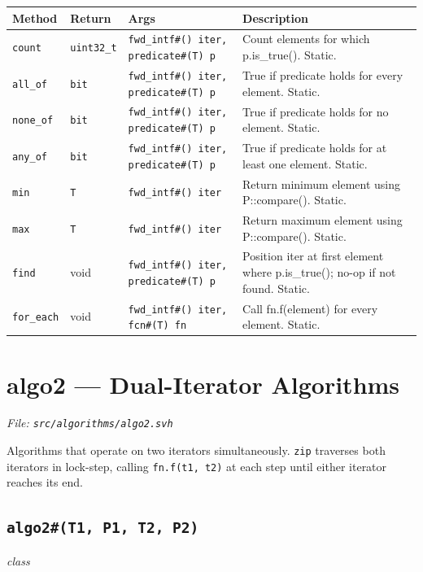 \documentclass[11pt,letterpaper]{report}
\begin{document}
\begin{xltabular}{\linewidth}{>{\small}p{1.35in} >{\small}p{1.25in} >{\small}p{0.95in} >{\small}X}
\toprule
\textbf{Method} & \textbf{Return} & \textbf{Args} & \textbf{Description} \\
\midrule
\endhead
\bottomrule
\endfoot
\texttt{count} & \texttt{uint32\_t} & \texttt{fwd\_intf\#() iter, predicate\#(T) p} & Count elements for which p.is\_true(). Static. \\
\texttt{all\_of} & \texttt{bit} & \texttt{fwd\_intf\#() iter, predicate\#(T) p} & True if predicate holds for every element. Static. \\
\texttt{none\_of} & \texttt{bit} & \texttt{fwd\_intf\#() iter, predicate\#(T) p} & True if predicate holds for no element. Static. \\
\texttt{any\_of} & \texttt{bit} & \texttt{fwd\_intf\#() iter, predicate\#(T) p} & True if predicate holds for at least one element. Static. \\
\texttt{min} & \texttt{T} & \texttt{fwd\_intf\#() iter} & Return minimum element using P::compare(). Static. \\
\texttt{max} & \texttt{T} & \texttt{fwd\_intf\#() iter} & Return maximum element using P::compare(). Static. \\
\texttt{find} & void & \texttt{fwd\_intf\#() iter, predicate\#(T) p} & Position iter at first element where p.is\_true(); no-op if not found. Static. \\
\texttt{for\_each} & void & \texttt{fwd\_intf\#() iter, fcn\#(T) fn} & Call fn.f(element) for every element. Static. \\
\end{xltabular}

\section{algo2 --- Dual-Iterator Algorithms}
\noindent\small\textit{File: \texttt{src/algorithms/algo2.svh}}\par

Algorithms that operate on two iterators simultaneously. \texttt{zip} traverses both iterators in lock-step, calling \texttt{fn.f(t1, t2)} at each step until either iterator reaches its end.

\subsection*{\texttt{algo2\#(T1, P1, T2, P2)}}
\noindent\small\textit{class}\par
\end{document}
